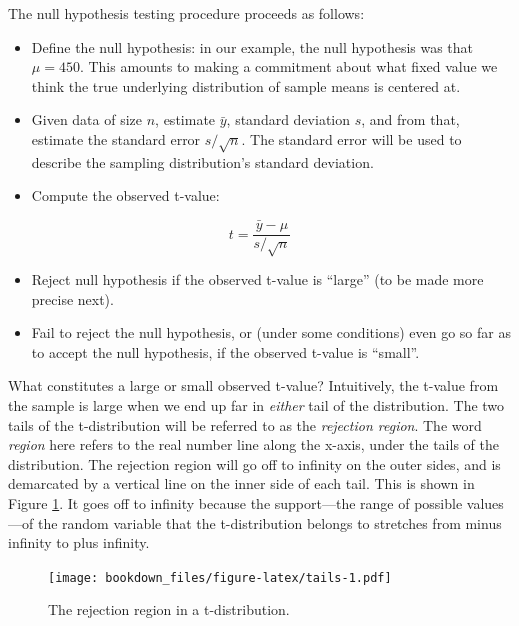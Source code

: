 \documentclass[12pt,]{krantz}
\providecommand{\tightlist}{%
  \setlength{\itemsep}{0pt}\setlength{\parskip}{0pt}}
\begin{document}
The null hypothesis testing procedure proceeds as follows:

\begin{itemize}
\tightlist
\item
  Define the null hypothesis: in our example, the null hypothesis was that \(\mu = 450\). This amounts to making a commitment about what fixed value we think the true underlying distribution of sample means is centered at.
\item
  Given data of size \(n\), estimate \(\bar{y}\), standard deviation \(s\), and from that, estimate the standard error \(s/\sqrt{n}\). The standard error will be used to describe the sampling distribution's standard deviation.
\item
  Compute the observed t-value:
\end{itemize}

\begin{equation}
t=\frac{\bar{y}-\mu}{s/\sqrt{n}}
\end{equation}

\begin{itemize}
\tightlist
\item
  Reject null hypothesis if the observed t-value is ``large'' (to be made more precise next).
\item
  Fail to reject the null hypothesis, or (under some conditions) even go so far as to accept the null hypothesis, if the observed t-value is ``small''.
\end{itemize}

What constitutes a large or small observed t-value?
Intuitively, the t-value from the sample is large when we end up far in \emph{either} tail of the distribution. The two tails of the t-distribution will be referred to as the \emph{rejection region}. The word \emph{region} here refers to the real number line along the x-axis, under the tails of the distribution. The rejection region will go off to infinity on the outer sides, and is demarcated by a vertical line on the inner side of each tail. This is shown in Figure \ref{fig:tails}. It goes off to infinity because the support---the range of possible values---of the random variable that the t-distribution belongs to stretches from minus infinity to plus infinity.

\begin{figure}
\centering
\texttt{[image: bookdown\_files/figure-latex/tails-1.pdf]}
\caption{\label{fig:tails}The rejection region in a t-distribution.}
\end{figure}
\end{document}
